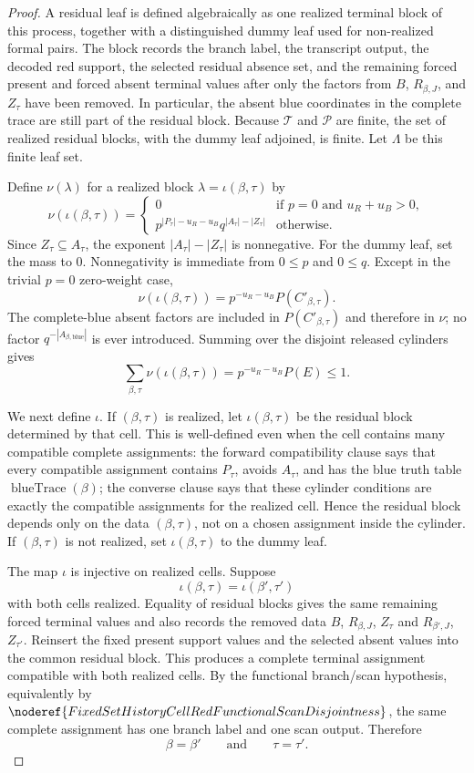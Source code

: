 \begin{proof}
A residual leaf is defined algebraically as one realized terminal block of
this process, together with a distinguished dummy leaf used for non-realized
formal pairs.  The block records the branch label, the transcript output, the
decoded red support, the selected residual absence set, and the remaining
forced present and forced absent terminal values after only the factors from
\(B\), \(R_{\beta,J}\), and \(Z_\tau\) have been removed.  In particular, the
absent blue coordinates in the complete trace are still part of the residual
block.  Because \(\mathcal T\) and \(\mathcal P\) are finite, the set of
realized residual blocks, with the dummy leaf adjoined, is finite.  Let
\(\Lambda\) be this finite leaf set.

Define \(\nu(\lambda)\) for a realized block
\(\lambda=\iota(\beta,\tau)\) by
\[
\nu(\iota(\beta,\tau)) = \begin{cases} 0 & \text{if } p=0 \text{ and } u_R+u_B>0, \\
p^{|P_\tau|-u_R-u_B} q^{|A_\tau|-|Z_\tau|} & \text{otherwise}. \end{cases}
\]
Since \(Z_\tau\subseteq A_\tau\), the exponent
\(|A_\tau|-|Z_\tau|\) is nonnegative.  For the dummy leaf, set the mass to
\(0\).  Nonnegativity is immediate from \(0\le p\) and \(0\le q\).
Except in the trivial \(p=0\) zero-weight case,
\[
\nu(\iota(\beta,\tau))
= p^{-u_R-u_B} P(C'_{\beta,\tau}).
\]
The complete-blue absent factors are included in \(P(C'_{\beta,\tau})\) and
therefore in \(\nu\); no factor \(q^{-|A_{\beta,\text{blue}}|}\) is ever
introduced.  Summing over the disjoint released cylinders gives
\[
\sum_{\beta,\tau}\nu(\iota(\beta,\tau))
= p^{-u_R-u_B}P(E)
\le 1.
\]

We next define \(\iota\).  If \((\beta,\tau)\) is realized, let
\(\iota(\beta,\tau)\) be the residual block determined by that cell.  This
is well-defined even when the cell contains many compatible complete
assignments: the forward compatibility clause says that every compatible
assignment contains \(P_\tau\), avoids \(A_\tau\), and has the blue truth
table \(\operatorname{blueTrace}(\beta)\); the converse clause says that
these cylinder conditions are exactly the compatible assignments for the
realized cell.  Hence the residual block depends only on the data
\((\beta,\tau)\), not on a chosen assignment inside the cylinder.  If
\((\beta,\tau)\) is not realized, set \(\iota(\beta,\tau)\) to the dummy
leaf.

The map \(\iota\) is injective on realized cells.  Suppose
\[
\iota(\beta,\tau)=\iota(\beta',\tau')
\]
with both cells realized.  Equality of residual blocks gives the same
remaining forced terminal values and also records the removed data
\(B\), \(R_{\beta,J}\), \(Z_\tau\) and
\(R_{\beta',J}\), \(Z_{\tau'}\).  Reinsert the fixed present support values
and the selected absent values into the common residual block.  This
produces a complete terminal assignment compatible with both realized cells.
By the functional branch/scan hypothesis, equivalently by
\(\noderef{FixedSetHistoryCellRedFunctionalScanDisjointness}\), the same
complete assignment has one branch label and one scan output.  Therefore
\[
\beta=\beta'\qquad\text{and}\qquad \tau=\tau'.
\]


\end{proof}
